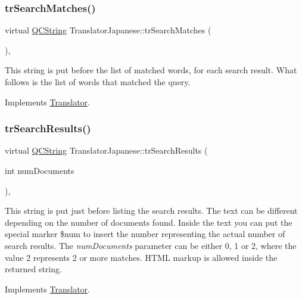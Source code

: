 \subsubsection{\texorpdfstring{trSearchMatches()}{trSearchMatches()}}
{\footnotesize\ttfamily virtual \mbox{\hyperlink{class_q_c_string}{Q\+C\+String}} Translator\+Japanese\+::tr\+Search\+Matches (\begin{DoxyParamCaption}{ }\end{DoxyParamCaption})\hspace{0.3cm}{\ttfamily [inline]}, {\ttfamily [virtual]}}

This string is put before the list of matched words, for each search result. What follows is the list of words that matched the query. 

Implements \mbox{\hyperlink{class_translator}{Translator}}.

\mbox{\label{class_translator_japanese_a11cdeaff91d4cc21c4e211ad9e771334}} 
\subsubsection{\texorpdfstring{trSearchResults()}{trSearchResults()}}
{\footnotesize\ttfamily virtual \mbox{\hyperlink{class_q_c_string}{Q\+C\+String}} Translator\+Japanese\+::tr\+Search\+Results (\begin{DoxyParamCaption}\item[{int}]{num\+Documents }\end{DoxyParamCaption})\hspace{0.3cm}{\ttfamily [inline]}, {\ttfamily [virtual]}}

This string is put just before listing the search results. The text can be different depending on the number of documents found. Inside the text you can put the special marker \$num to insert the number representing the actual number of search results. The {\itshape num\+Documents} parameter can be either 0, 1 or 2, where the value 2 represents 2 or more matches. H\+T\+ML markup is allowed inside the returned string. 

Implements \mbox{\hyperlink{class_translator}{Translator}}.

\mbox{\label{class_translator_japanese_afe9d042891dc2843e36bf470ec4894ca}} 

